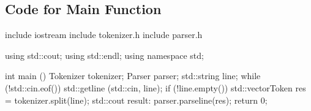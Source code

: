 \documentclass[letterpaper,10pt,english]{sphinxmanual}
\begin{document}
\subsection{Code for Main Function}
\label{\detokenize{index:code-for-main-function}}
\begin{sphinxVerbatim}[commandchars=\\\{\}]
\PYGZsh{}include \PYGZlt{}iostream\PYGZgt{}
\PYGZsh{}include \PYGZdq{}tokenizer.h\PYGZdq{}
\PYGZsh{}include \PYGZdq{}parser.h\PYGZdq{}

using std::cout;
using std::endl;
using namespace std;

int main () \PYGZob{}
  Tokenizer tokenizer;
  Parser parser;
  std::string line;
  while (!std::cin.eof()) \PYGZob{}
    std::getline (std::cin, line);
    if (!line.empty())
    \PYGZob{}
      std::vector\PYGZlt{}Token\PYGZgt{} res = tokenizer.split(line);
      std::cout \PYGZlt{}\PYGZlt{} \PYGZdq{}result: \PYGZdq{} \PYGZlt{}\PYGZlt{} parser.parse\PYGZus{}line(res);
    \PYGZcb{}
  \PYGZcb{}
  return 0;
\PYGZcb{}
\end{sphinxVerbatim}
\end{document}
